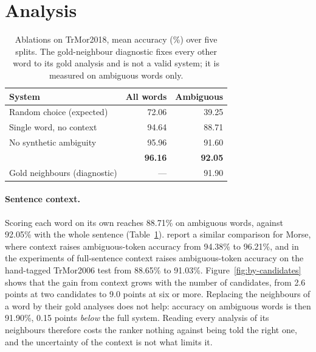 \section{Analysis}
\label{sec:analysis}

\begin{table}[t]
\centering
\small
\begin{tabular}{@{}lrr@{}}
\toprule
System & All words & Ambiguous \\
\midrule
Random choice (expected) & 72.06 & 39.25 \\
Single word, no context & 94.64 & 88.71 \\
No synthetic ambiguity & 95.96 & 91.60 \\
\savyar{} & \textbf{96.16} & \textbf{92.05} \\
\midrule
Gold neighbours (diagnostic) & --- & 91.90 \\
\bottomrule
\end{tabular}
\caption{Ablations on TrMor2018, mean accuracy (\%) over five splits. The gold-neighbour diagnostic fixes every other word to its gold analysis and is not a valid system; it is measured on ambiguous words only.}
\label{tab:ablation}
\end{table}

\paragraph{Sentence context.}
Scoring each word on its own reaches 88.71\% on ambiguous words, against 92.05\% with the whole sentence (Table~\ref{tab:ablation}). \citet{akyurek-etal-2019-morphological} report a similar comparison for Morse, where context raises ambiguous-token accuracy from 94.38\% to 96.21\%, and in the experiments of \citet{shen-etal-2016-role} full-sentence context raises ambiguous-token accuracy on the hand-tagged TrMor2006 test from 88.65\% to 91.03\%. Figure~\ref{fig:by-candidates} shows that the gain from context grows with the number of candidates, from 2.6 points at two candidates to 9.0 points at six or more. Replacing the neighbours of a word by their gold analyses does not help: accuracy on ambiguous words is then 91.90\%, 0.15 points \emph{below} the full system. Reading every analysis of its neighbours therefore costs the ranker nothing against being told the right one, and the uncertainty of the context is not what limits it.



